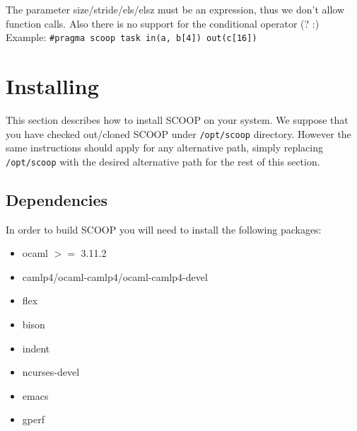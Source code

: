 \documentclass[
a4paper,
12pt,
]{article}
\begin{document}
      The parameter size/stride/els/elsz must be an expression, thus
      we don't allow function calls. Also there is no support for the
      conditional operator (? :)\\

    Example:
      \verb!#pragma scoop task in(a, b[4]) out(c[16])!


\section{Installing}

This section describes how to install SCOOP on your system.  We
suppose that you have checked out/cloned SCOOP under \verb!/opt/scoop!
directory.  However the same instructions should apply for any
alternative path, simply replacing \verb!/opt/scoop! with the desired
alternative path for the rest of this section.

\subsection{Dependencies}

In order to build SCOOP you will need to install the following
packages:

\begin{itemize}
  \setlength{\itemsep}{1pt}
  \setlength{\parskip}{0pt}
  \setlength{\parsep}{0pt}
  \item ocaml $>=$ 3.11.2
  \item camlp4/ocaml-camlp4/ocaml-camlp4-devel
  \item flex
  \item bison
  \item indent
  \item ncurses-devel
  \item emacs
  \item gperf
\end{itemize}

\end{document}
